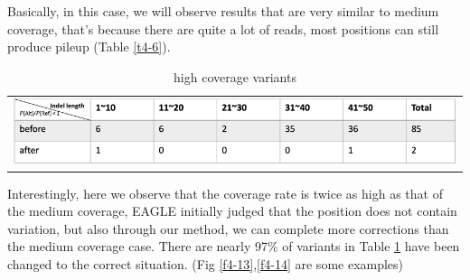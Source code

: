 Basically, in this case, we will observe results that are very similar to medium coverage, that's because there are quite a lot of reads, most positions can still produce pileup (Table \ref{t4-6}).

\vspace{1cm}
\begin{table}[h]
    \centering
    \caption[high coverage variants]{high coverage variants}
    \vspace{-0.5cm}
    \begin{tabular}{c}
        \includegraphics[width=1\textwidth]{body/image/t4-7.png}
    \end{tabular}
    \label{t4-7}
\end{table}

Interestingly, here we observe that the coverage rate is twice as high as that of the medium coverage, EAGLE initially judged that the position does not contain variation, but also through our method, we can complete more corrections than the medium coverage case. There are nearly 97\% of variants in Table \ref{t4-7} have been changed to the correct situation. (Fig \ref{f4-13},\ref{f4-14} are some examples)

